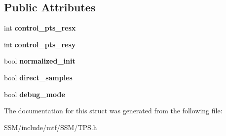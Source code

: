 \subsection*{Public Attributes}
\begin{DoxyCompactItemize}
\item 
\hypertarget{structTPSParams_a740eb66f4ca9bf49265e41959375f74c}{int {\bfseries control\-\_\-pts\-\_\-resx}}\label{structTPSParams_a740eb66f4ca9bf49265e41959375f74c}

\item 
\hypertarget{structTPSParams_a2dd16136a50a3cbc82954850021da5b0}{int {\bfseries control\-\_\-pts\-\_\-resy}}\label{structTPSParams_a2dd16136a50a3cbc82954850021da5b0}

\item 
\hypertarget{structTPSParams_a27dd9b31a4c9b457661093b39b93936b}{bool {\bfseries normalized\-\_\-init}}\label{structTPSParams_a27dd9b31a4c9b457661093b39b93936b}

\item 
\hypertarget{structTPSParams_a3a4465316d06398687194d2f7e0225c6}{bool {\bfseries direct\-\_\-samples}}\label{structTPSParams_a3a4465316d06398687194d2f7e0225c6}

\item 
\hypertarget{structTPSParams_ae9fd69ab5ff816aa2eda2026a6326121}{bool {\bfseries debug\-\_\-mode}}\label{structTPSParams_ae9fd69ab5ff816aa2eda2026a6326121}

\end{DoxyCompactItemize}


The documentation for this struct was generated from the following file\-:\begin{DoxyCompactItemize}
\item 
S\-S\-M/include/mtf/\-S\-S\-M/T\-P\-S.\-h\end{DoxyCompactItemize}
